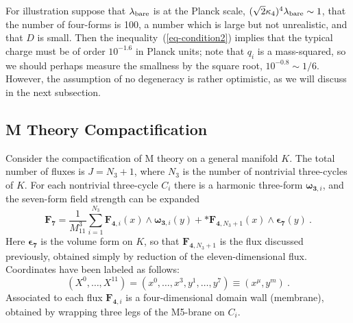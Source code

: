 \documentclass[12pt]{article}
\begin{document}
For illustration suppose that $\lambda_{\rm bare}$ is at the Planck
scale, $(\sqrt 2\kappa_4)^4 \lambda_{\rm bare} \sim 1$, that the
number of four-forms is 100, a number which is large but not
unrealistic, and that $D$ is small. Then the
inequality~(\ref{eq-condition2}) implies that the typical charge must
be of order $10^{-1.6}$ in Planck units; note that $q_i$ is a
mass-squared, so we should perhaps measure the smallness by the square
root, $10^{-0.8} \sim 1/6$.  However, the assumption of no degeneracy
is rather optimistic, as we will discuss in the next subsection.


\subsection{M Theory Compactification}

Consider the compactification of M theory on a general manifold $K$.
The total number of fluxes is $J = N_3 + 1$, where $N_3$ is the number
of nontrivial three-cycles of $K$.  For each nontrivial three-cycle
$C_i$ there is a harmonic three-form $\mathbf{\omega}_{{\mathbf
3},i}$, and the seven-form field strength can be expanded
\begin{equation}
\mathbf{F_7} =
\frac{1}{M_{11}^3} \sum_{i=1}^{N_3} \mathbf{F}_{\mathbf{4},i}(x) \wedge
\mathbf{\omega}_{{\mathbf 3},i}(y)
+ *\mathbf{F}_{\mathbf{4},N_3+1}(x) \wedge \mathbf{\epsilon_7}
(y) \ . \label{eq-f7-f4}
\end{equation}
Here $\mathbf{\epsilon_7}$ is the volume form on $K$, so that
$\mathbf{F}_{\mathbf{4},N_3+1}$ is the flux discussed previously,
obtained simply by reduction of the eleven-dimensional flux.
Coordinates have been labeled as follows:
\begin{equation}
(X^0,\ldots,X^{11}) =
(x^0,\ldots,x^3,y^1,\ldots,y^7) \equiv (x^\mu,y^m)\ .
\end{equation}
Associated to each flux $\mathbf{F}_{\mathbf{4},i}$ is a
four-dimensional domain wall (membrane), obtained by wrapping three
legs of the M5-brane on $C_i$.
\end{document}
